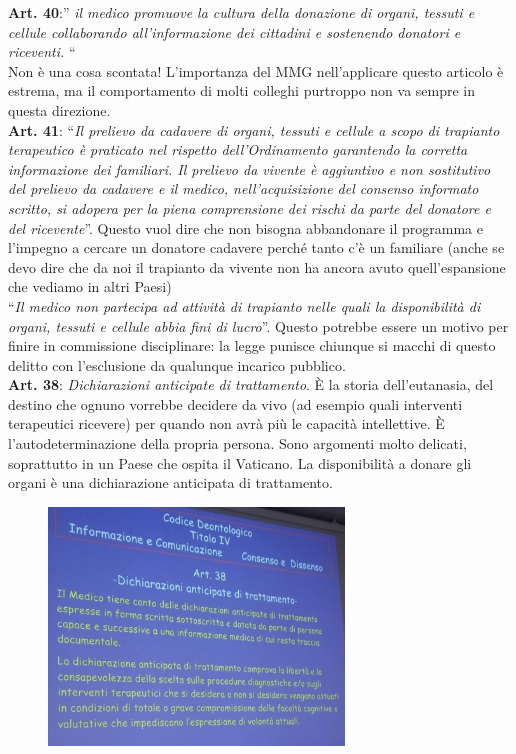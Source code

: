 \textbf{Art. 40}:'' \emph{il medico promuove la cultura della donazione
di organi, tessuti e cellule collaborando all'informazione dei cittadini
e sostenendo donatori e riceventi.} ``
\\
Non è una cosa scontata! L'importanza del MMG nell'applicare questo
articolo è estrema, ma il comportamento di molti colleghi purtroppo non
va sempre in questa direzione.
\\
\textbf{Art. 41}: ``\emph{Il prelievo da cadavere di organi, tessuti e
cellule a scopo di trapianto terapeutico è praticato nel rispetto
dell'Ordinamento garantendo la corretta informazione dei familiari. Il
prelievo da vivente è aggiuntivo e non sostitutivo del prelievo da
cadavere e il medico, nell'acquisizione del consenso informato scritto,
si adopera per la piena comprensione dei rischi da parte del donatore e
del ricevente}''. Questo vuol dire che non bisogna abbandonare il
programma e l'impegno a cercare un donatore cadavere perché tanto c'è un
familiare (anche se devo dire che da noi il trapianto da vivente non ha
ancora avuto quell'espansione che vediamo in altri Paesi)
\\
``\emph{Il medico non partecipa ad attività di trapianto nelle quali la
disponibilità di organi, tessuti e cellule abbia fini di lucro}''.
Questo potrebbe essere un motivo per finire in commissione disciplinare:
la legge punisce chiunque si macchi di questo delitto con l'esclusione
da qualunque incarico pubblico.
\\
\textbf{Art. 38}: \emph{Dichiarazioni anticipate di trattamento}. È la
storia dell'eutanasia, del destino che ognuno vorrebbe decidere da vivo
(ad esempio quali interventi terapeutici ricevere) per quando non avrà
più le capacità intellettive. È l'autodeterminazione della propria
persona. Sono argomenti molto delicati, soprattutto in un Paese che
ospita il Vaticano. La disponibilità a donare gli organi è una
dichiarazione anticipata di trattamento.

\begin{figure}[!ht]
\centering
	\includegraphics[width=0.7\textwidth]{34/image9.jpeg}
	\end{figure}
